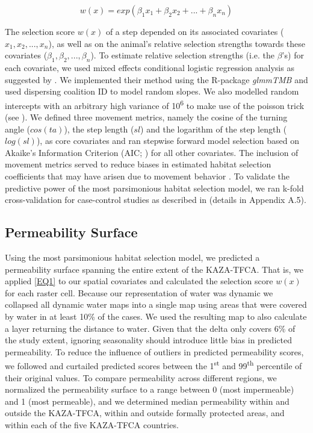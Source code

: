 \documentclass[abstract=on,10pt,a4paper,bibliography=totocnumbered]{article}
\begin{document}
\begin{equation}
\label{EQ1}
  w(x) = exp(\beta_1 x_1 + \beta_2 x_2 + ... + \beta_n x_n)
\end{equation}

\noindent The selection score \(w(x)\) of a step depended on its associated
covariates (\(x_1, x_2, ..., x_n\)), as well as on the animal's relative
selection strengths towards these covariates (\(\beta_1, \beta_2, ...,
\beta_n\)). To estimate relative selection strengths (i.e. the \(\beta\)'s) for
each covariate, we used mixed effects conditional logistic regression analysis
as suggested by \cite{Muff.2020}. We implemented their method using the
R-package \textit{glmmTMB} \citep{Mollie.2017} and used dispersing coalition ID
to model random slopes. We also modelled random intercepts with an arbitrary
high variance of 10\textsuperscript{6} to make use of the poisson trick (see
\citealp{Muff.2020}). We defined three movement metrics, namely the cosine of
the turning angle (\(cos(ta)\)), the step length (\(sl\)) and the logarithm of
the step length (\(log(sl)\)), as core covariates and ran stepwise forward model
selection based on Akaike's Information Criterion (AIC; \citealp{Burnham.2002})
for all other covariates. The inclusion of movement metrics served to reduce
biases in estimated habitat selection coefficients that may have arisen due to
movement behavior \citep{Avgar.2016}. To validate the predictive power of the
most parsimonious habitat selection model, we ran k-fold cross-validation for
case-control studies as described in \cite{Fortin.2009} (details in Appendix
A.5).

\subsection{Permeability Surface}
Using the most parsimonious habitat selection model, we predicted a permeability
surface spanning the entire extent of the KAZA-TFCA. That is, we applied
\ref{EQ1} to our spatial covariates and calculated the selection score \(w(x)\)
for each raster cell. Because our representation of water was dynamic we
collapsed all dynamic water maps into a single map using areas that were covered
by water in at least 10\% of the cases. We used the resulting map to also
calculate a layer returning the distance to water. Given that the delta only
covers 6\% of the study extent, ignoring seasonality should introduce little
bias in predicted permeability. To reduce the influence of outliers in predicted
permeability scores, we followed \cite{Squires.2013} and curtailed predicted
scores between the 1\textsuperscript{st} and 99\textsuperscript{th} percentile
of their original values. To compare permeability across different regions, we
normalized the permeability surface to a range between 0 (most impermeable) and
1 (most permeable), and we determined median permeability within and outside the
KAZA-TFCA, within and outside formally protected areas, and within each of the
five KAZA-TFCA countries.
\end{document}
